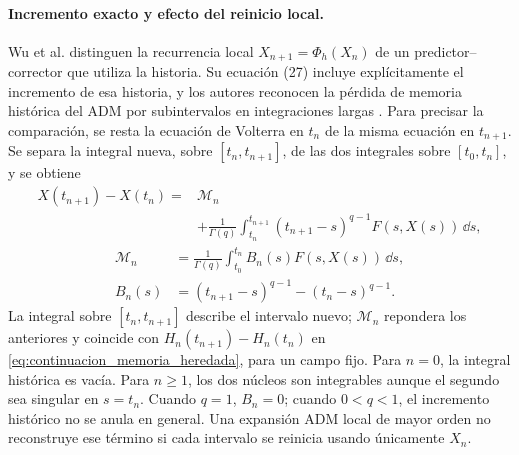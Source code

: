 \paragraph{Incremento exacto y efecto del reinicio local.}
\label{subsec:numerical-adm-history}
Wu et al. distinguen la recurrencia local \(X_{n+1}=\Phi_h(X_n)\) de un
predictor--corrector que utiliza la historia. Su ecuación (27) incluye
explícitamente el incremento de esa historia, y los autores reconocen la
pérdida de memoria histórica del ADM por subintervalos en integraciones
largas \cite{Wu2023ArctanChua}. Para precisar la comparación, se resta la
ecuación de Volterra en \(t_n\) de la misma ecuación en \(t_{n+1}\). Se
separa la integral nueva, sobre \([t_n,t_{n+1}]\), de las dos integrales
sobre \([t_0,t_n]\), y se obtiene
\begin{equation}
 \begin{aligned}
 X(t_{n+1})-X(t_n)={}&\mathcal M_n\\
 &+\frac1{\Gamma(q)}\int_{t_n}^{t_{n+1}}
 (t_{n+1}-s)^{q-1}F(s,X(s))\,\dd s,
 \end{aligned}
 \label{eq:numerical-adm-increment}
\end{equation}
\begin{equation}
 \begin{aligned}
 \mathcal M_n&=\frac1{\Gamma(q)}\int_{t_0}^{t_n}
                  B_n(s)F(s,X(s))\,\dd s,\\
 B_n(s)&=(t_{n+1}-s)^{q-1}-(t_n-s)^{q-1}.
 \end{aligned}
 \label{eq:numerical-adm-memory}
\end{equation}
La integral sobre \([t_n,t_{n+1}]\) describe el intervalo nuevo;
\(\mathcal M_n\) repondera los anteriores y coincide con
\(H_n(t_{n+1})-H_n(t_n)\) en
\cref{eq:continuacion_memoria_heredada}, para un campo fijo. Para \(n=0\),
la integral histórica es vacía. Para \(n\geq1\), los dos núcleos son
integrables aunque el segundo sea singular en \(s=t_n\). Cuando \(q=1\),
\(B_n=0\); cuando \(0<q<1\), el incremento histórico no se anula en general.
Una expansión ADM local de mayor orden no reconstruye ese término si cada
intervalo se reinicia usando únicamente \(X_n\).

